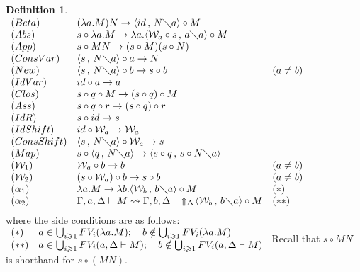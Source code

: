 \documentclass[11pt]{amsart}
\theoremstyle{plain}
\theoremstyle{definition}
\newtheorem{definition}[theorem]{Definition}
\theoremstyle{remark}
\numberwithin{equation}{section}
\newcommand{\ci}{\circ}
\newcommand{\ri}{\rightsquigarrow}
\newcommand{\mi}{\,,\,}
\newcommand{\is}{\diagdown}
\newcommand{\x}{a}
\newcommand{\y}{b}
\renewcommand{\pi}{\mathcal{W}}
\begin{document}
\begin{definition}
$
\begin{array}{lll}
(Beta) & (\lambda \x.M)N\rightarrow \langle id\mi N\is \x\rangle\ci M &\\
(Abs) & s\ci \lambda \x.M\rightarrow\lambda \x.\langle \pi_{\x}\ci
s\mi \x\is
\x\rangle\ci M &\\
(App) & s\ci MN\rightarrow(s\ci  M)(s\ci  N) &\\
(ConsVar) & \langle s\mi N\is \x\rangle\ci \x\rightarrow N &\\
(New) & \langle s\mi N\is \x\rangle\ci \y\rightarrow  s\ci \y & (\x\neq \y)\\
(IdVar) &  id\ci \x\rightarrow \x &\\
(Clos) & s\ci q\ci M\rightarrow (s\ci q)\ci M &\\
(Ass) & s\ci q\ci  r\rightarrow (s\ci q)\ci r &\\
(IdR) & s\ci id\rightarrow s &\\
(IdShift) & id\ci \pi_{\x}\rightarrow\pi_{\x} &\\
(ConsShift) & \langle s\mi N\is \x\rangle\ci \pi_{\x}\rightarrow s &\\
(Map) & s\ci \langle q\mi N\is \x\rangle\rightarrow\langle
s\ci q \mi s\ci N\is \x\rangle &\\
(\pi_1) & \pi_{\x}\ci \y\rightarrow \y & (\x\neq \y)\\
(\pi_2) & (s\ci\pi_{\x})\ci \y\rightarrow s\ci \y & (\x \neq
\y)\\
(\alpha_1) & \lambda \x.M\rightarrow\lambda
\y.\langle\pi_{\y}\mi \y\is \x\rangle\ci M & (*)\\
(\alpha_2) & \Gamma,\x,\Delta\vdash M\ri\Gamma,\y,\Delta\vdash\,
\Uparrow_{\Delta}\!\langle\pi_{\y}\mi \y\is \x\rangle\ci M & (**)
\\[5pt]
\end{array}$\\
where the side conditions are as follows:\\[5pt]
$
\begin{array}{ll}
(*) & \x \in \bigcup_{i\geqslant 1} FV_i(\lambda \x.M);\quad
\y\notin \bigcup_{i\geqslant 1} FV_i(\lambda \x.M
 )\\
 (**) & \x\in \bigcup_{i\geqslant 1} FV_i(\x,\Delta\vdash M);\quad \y\notin
 \bigcup_{i\geqslant 1}FV_i(\x,\Delta\vdash M
 )\\
\end{array}\\[5pt]
$
Recall that $s\ci MN$ is shorthand for $s\ci(MN)$.\\
\end{definition}
\end{document}
